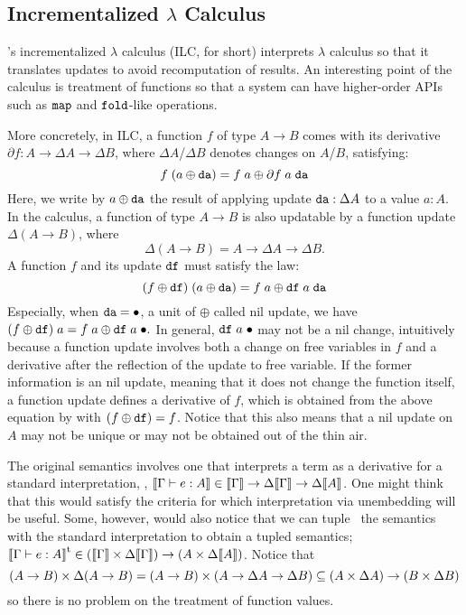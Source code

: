 \documentclass{article}
\let\cite=\citep
\theoremstyle{definition}
\begin{document}
\subsection{Incrementalized $\lambda$ Calculus}

\newcommand{\NilChange}{{\bullet}}

\citet{CaiGRO14}'s incrementalized $\lambda$ calculus (ILC, for short) interprets $\lambda$ calculus so that it translates updates to avoid 
recomputation of results. An interesting point of the calculus is treatment of functions so that a system can have higher-order APIs such as $\texttt{map}$ and $\texttt{fold}$-like operations. 

More concretely, in ILC, a function $f$ of type $A \to B$ comes with its derivative 
$\partial f : A \to \Delta A \to \Delta B$, where $\Delta A$/$\Delta B$ denotes changes on $A$/$B$, satisfying: 
\[
 f \; (a \oplus \texttt{da}) = f \; a \oplus \partial f \; a \; \texttt{da} 
\]
Here, we write by $a \oplus \texttt{da}$ the result of applying update $\texttt{da} : \Delta A$ to a value $a : A$. 
In the calculus, a function of type $A \to B$ is also updatable by a function update $\Delta (A \to B)$, where 
\[
  \Delta(A \to B) = A \to \Delta A \to \Delta B\text{.}
\]
A function $f$ and its update $\texttt{df}$ must satisfy the law: 
\[
  (f \oplus \texttt{df}) \; (a \oplus \texttt{da}) = f \; a \oplus \texttt{df} \; a \; \texttt{da} 
\]
Especially, when $\var{da} = \NilChange$, a unit of $\oplus$ called nil update, we have 
\(
(f \oplus \var{df}) \A a  = f \A a \oplus \var{df} \A a \A \NilChange\text{.}
\) 
In general, $\var{df} \A a \A \NilChange$ may not be a nil change, intuitively because a function update involves 
both a change on free variables in $f$ and a derivative after the reflection of the update to free variable. 
If the former information is an nil update, meaning that it does not change the function itself, a function 
update defines a derivative of $f$, which is obtained from the above equation by with $(f \oplus \texttt{df}) = f$. 
Notice that this also means that a nil update on $A$ may not be unique or may not be obtained out of the thin air. 

The original semantics involves one that interprets a term as a derivative for a standard interpretation, \ie, 
$\sem{ \Gamma \vdash e : A } \in \sem{\Gamma} \to \Delta \sem{\Gamma} \to \Delta \sem{A}$. One might think that this 
would satisfy the criteria for which interpretation via unembedding will be useful. Some, however, would also notice
that we can tuple~\cite{HuITT97,Chin93} the semantics with the standard interpretation to obtain a tupled semantics; 
$\sem{ \Gamma \vdash e : A }^\mathrm{t} \in (\sem{\Gamma} \x \Delta \sem{\Gamma}) \to (A \x \Delta \sem{A})$. 
Notice that 
\[
 (A \to B) \times \Delta (A \to B) 
 =  (A \to B) \times (A \to \Delta A \to \Delta B) 
 \subseteq (A \times \Delta A) \to (B \times \Delta B)
\]
so there is no problem on the treatment of function values. 
\end{document}
